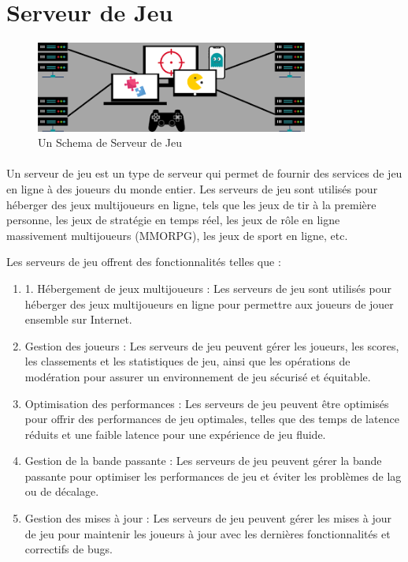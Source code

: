 \section{Serveur de Jeu}
	\begin{figure}[h]
\hbox{\includegraphics[width=0.8\textwidth]{PhotoMemoire/serveur_jeux.png}}
\caption{Un Schema de Serveur de Jeu}
	\end{figure}
\paragraph{ }
Un serveur de jeu est un type de serveur qui permet de fournir des services de jeu en ligne à des joueurs du monde entier. Les serveurs de jeu sont utilisés pour héberger des jeux multijoueurs en ligne, tels que les jeux de tir à la première personne, les jeux de stratégie en temps réel, les jeux de rôle en ligne massivement multijoueurs (MMORPG), les jeux de sport en ligne, etc.

Les serveurs de jeu offrent des fonctionnalités telles que :
\begin{enumerate}
	
  \item 1. Hébergement de jeux multijoueurs : Les serveurs de jeu sont utilisés pour héberger des jeux multijoueurs en ligne pour permettre aux joueurs de jouer ensemble sur Internet.
 
 \item  Gestion des joueurs : Les serveurs de jeu peuvent gérer les joueurs, les scores, les classements et les statistiques de jeu, ainsi que les opérations de modération pour assurer un environnement de jeu sécurisé et équitable.
 
 \item  Optimisation des performances : Les serveurs de jeu peuvent être optimisés pour offrir des performances de jeu optimales, telles que des temps de latence réduits et une faible latence pour une expérience de jeu fluide.
 
\item    Gestion de la bande passante : Les serveurs de jeu peuvent gérer la bande passante pour optimiser les performances de jeu et éviter les problèmes de lag ou de décalage.
 
 \item  Gestion des mises à jour : Les serveurs de jeu peuvent gérer les mises à jour de jeu pour maintenir les joueurs à jour avec les dernières fonctionnalités et correctifs de bugs.
 
\end{enumerate}


